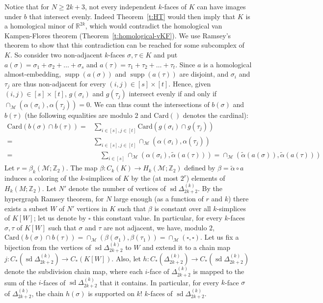 \documentclass[11pt]{article}
\newcommand{\R}{\mathbb{R}}
\newcommand{\Z}{\mathbb{Z}}
\newcommand{\M}{\mathcal{M}}
\DeclareMathOperator{\supp}{supp}
\DeclareMathOperator{\sd}{sd}
\newcommand{\card}[1]{\textrm{Card}\pth{#1}}
\newcommand{\pth}[1]{\left(#1\right)}
\begin{document}
%
\noindent
Notice that for $N \ge 2k+3$, not every independent $k$-faces of $K$ can have images under $b$ that intersect evenly. Indeed Theorem~\ref{t:HT} would then imply that $K$ is a homological minor of $\R^{2k}$, which would contradict the homological van Kampen-Flores theorem (Theorem~\ref{t:homological-vKF}). We use Ramsey's theorem to show that this contradiction can be reached for some subcomplex of $K$.
%
\medskip
%
So consider two non-adjacent $k$-faces $\sigma,\tau \in K$ and put $a(\sigma) = \sigma_1+\sigma_2+\ldots +\sigma_s$ and $a(\tau) =\tau_1+\tau_2+\ldots+\tau_t$. Since $a$ is a homological almost-embedding, $\supp(a(\sigma))$ and $\supp(a(\tau))$ are disjoint, and $\sigma_i$ and $\tau_j$ are thus non-adjacent for every $(i,j) \in [s] \times [t]$. Hence, given $(i,j) \in [s] \times [t]$, $g(\sigma_i)$ and $g(\tau_j)$ intersect evenly if and only if $\cap_{\M}(\alpha(\sigma_i),\alpha(\tau_j)) = 0$. We can thus count the intersections of $b(\sigma)$ and $b(\tau)$ (the following equalities are modulo $2$ and $\card{}$ denotes the cardinal):
%
\[\begin{aligned}
\card{b(\sigma) \cap b(\tau)} = &\sum_{i \in [s], j \in [t]} \card{g(\sigma_i) \cap g(\tau_j)}\\
= &\sum_{i \in [s], j \in [t]} \cap_{\M}(\alpha(\sigma_i),\alpha(\tau_j))\\
= &\quad\sum_{i \in [s]} \cap_{\M}(\alpha(\sigma_i),\tilde{\alpha}(a(\tau)))= \cap_{\M}(\tilde{\alpha}(a(\sigma)),\tilde{\alpha}(a(\tau)))
\end{aligned}  \]
%
\medskip
%
Let $r = \beta_k(\M;\Z_2)$. The map $\beta: C_k(K) \to H_k(\M;\Z_2)$ defined by $\beta = \tilde{\alpha} \circ a$ induces a coloring of the $k$-simplices of $K$ by the (at most $2^r$) elements of $H_k(M;\Z_2)$. Let $N'$ denote the number of vertices of $\sd \Delta_{2k+2}^{(k)}$. By the hypergraph Ramsey theorem, for $N$ large enough (as a function of $r$ and $k$) there exists a subset $W$ of $N'$ vertices in $K$ such that $\beta$ is constant over all $k$-simplices of $K[W]$; let us denote by $\square$ this constant value. In particular, for every $k$-faces $\sigma,\tau$ of $K[W]$ such that $\sigma$ and $\tau$ are not adjacent, we have, modulo $2$, $\card{b(\sigma) \cap b(\tau)} = \cap_{\M}(\beta(\sigma_1),\beta(\tau_1)) = \cap_{\M}(\square,\square)$. Let us fix a bijection from the vertices of $\sd\Delta_{2k+2}^{(k)}$ to $W$ and extend it to a chain map $j:C_*\pth{\sd\Delta_{2k+2}^{(k)}}\to C_*(K[W])$. Also, let $h:C_*\pth{\Delta_{2k+2}^{(k)}}\to C_*\pth{\sd \Delta_{2k+2}^{(k)}}$ denote the subdivision chain map, where each $i$-face of $\Delta_{2k+2}^{(k)}$ is mapped to the sum of the $i$-faces of $\sd \Delta_{2k+2}^{(k)}$ that it contains. In particular, for every $k$-face $\sigma$ of $\Delta_{2k+2}^{(k)}$, the chain $h(\sigma)$ is supported on $k!$ $k$-faces of $\sd \Delta_{2k+2}^{(k)}$.
\end{document}
